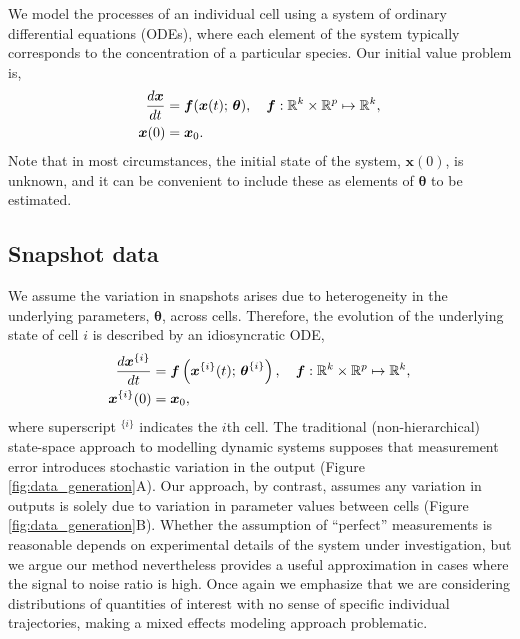 We model the processes of an individual cell using a system of ordinary differential equations (ODEs), where each element of the system typically corresponds to the concentration of a particular species. Our initial value problem is,
%
\begin{equation}\label{eq:ode}
\begin{aligned}
\frac{d\boldsymbol{x}}{dt} &= \boldsymbol{f}(\boldsymbol{x}(t); \, \boldsymbol{\theta}), \quad \boldsymbol{f}: \mathbb{R}^k \times \mathbb{R}^p \mapsto \mathbb{R}^k, \\
\boldsymbol{x}(0) &= \boldsymbol{x}_0.
\end{aligned}
\end{equation}
%
Note that in most circumstances, the initial state of the system, $\boldsymbol{x}(0)$, is unknown, and it can be convenient to include these as elements of $\boldsymbol{\theta}$ to be estimated.

\subsection{Snapshot data}
We assume the variation in snapshots arises due to heterogeneity in the underlying parameters, $\boldsymbol{\theta}$, across cells. Therefore, the evolution of the underlying state of cell $i$ is described by an idiosyncratic ODE,
%
\begin{equation} \label{eq:ode_i}
\begin{aligned}
\frac{d\boldsymbol{x}^{\{i\}}}{dt} &= \boldsymbol{f} \left( \boldsymbol{x}^{\{i\}}(t); \, \boldsymbol{\theta}^{\{i\}} \right),
                                      \quad \boldsymbol{f}: \mathbb{R}^k \times \mathbb{R}^p \mapsto \mathbb{R}^k, \\
\boldsymbol{x}^{\{i\}}(0) &= \boldsymbol{x}_0,
\end{aligned}
\end{equation}
where superscript $^{\{i\}}$ indicates the $i$th cell.
%
The traditional (non-hierarchical) state-space approach to modelling dynamic systems supposes that measurement error introduces stochastic variation in the output (Figure \ref{fig:data_generation}A). Our approach, by contrast, assumes any variation in outputs is solely due to variation in parameter values between cells (Figure \ref{fig:data_generation}B). Whether the assumption of ``perfect'' measurements is reasonable depends on experimental details of the system under investigation, but we argue our method nevertheless provides a useful approximation in cases where the signal to noise ratio is high. Once again we emphasize that we are considering distributions of quantities of interest with no sense of specific individual trajectories, making a mixed effects modeling approach problematic.


